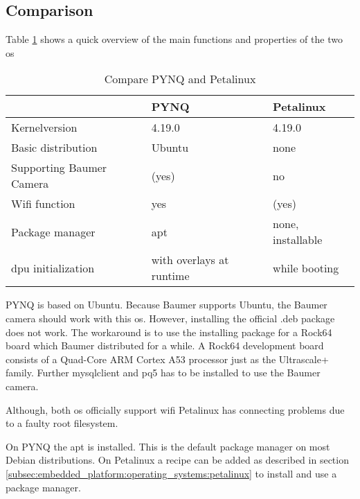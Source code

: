 \subsection{Comparison}
\label{subsec:embedded_platform:operating_systems:comparison}
Table \ref{tab:compare_os} shows a quick overview of the main functions and properties of the two \acrlong{os}

\begin{table}[hb]
  \caption{Compare PYNQ and Petalinux}
  \label{tab:compare_os}
  \centering
  \begin{tabular}{lll}
    \toprule
    \textbf{} & \textbf{PYNQ} & \textbf{Petalinux} \\
    \midrule
    Kernelversion & 4.19.0 & 4.19.0 \cite{petalinux_2019_1_release_notes} \\
    Basic distribution & Ubuntu \cite{pynq_presentation} & none \\
    Supporting Baumer Camera & (yes) \cite{baumer_prog_guide} & no \\
    Wifi function & yes & (yes) \\
    Package manager & \acrshort{apt} & none, installable \\
    dpu initialization & with overlays at runtime \cite{pynq_overlays} & while booting \\
    \bottomrule
  \end{tabular}
\end{table}

PYNQ is based on Ubuntu.
Because Baumer supports Ubuntu, the Baumer camera should work with this \acrlong{os}.
However, installing the official .deb package does not work.
The workaround is to use the installing package for a Rock64 board which Baumer distributed for a while.
A Rock64 development board consists of a Quad-Core ARM Cortex A53 processor just as the Ultrascale+ family.
Further mysqlclient and pq5 has to be installed to use the Baumer camera.

Although, both \acrshort{os} officially support wifi Petalinux has connecting problems due to a faulty root filesystem.

On PYNQ the \acrfull{apt} is installed.
This is the default package manager on most Debian distributions.
On Petalinux a recipe can be added as described in section \ref{subsec:embedded_platform:operating_systems:petalinux} to install and use a package manager.

